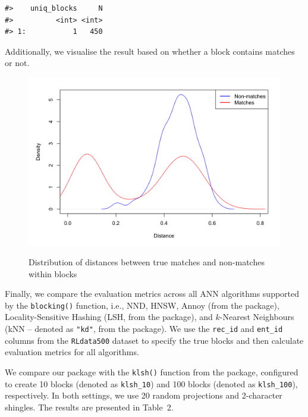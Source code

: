 \begin{verbatim}
#>    uniq_blocks     N
#>          <int> <int>
#> 1:           1   450
\end{verbatim}

Additionally, we visualise the result based on whether a block contains
matches or not.

\begin{figure}
\includegraphics[width=0.8\linewidth,alt={A density plot of distances between units that are true matches (red) and non-matches (blue) within blocks created by the \CRANpkg{blocking}. The distribution of distance for matches is bimodal. There is a group of units that are true matches where the distance between them is small (less than 0.2), whilst for the second group, the distance is similar to true non-matches (between 0.4 and 0.6). This distance may be used as additional information for deduplication (and record linkage) studies.}]{./figures/fig-1-density} \caption{Distribution of distances between true matches and non-matches within blocks}\label{fig:penguins-alison}
\end{figure}

Finally, we compare the evaluation metrics across all ANN algorithms
supported by the \texttt{blocking()} function, i.e., NND, HNSW, Annoy (from the
 package), Locality-Sensitive Hashing (LSH, from the
 package), and \(k\)-Nearest Neighbours (kNN -- denoted as
\texttt{"kd"}, from the  package). We use the \texttt{rec\_id} and
\texttt{ent\_id} columns from the \texttt{RLdata500} dataset to specify the true blocks
and then calculate evaluation metrics for all algorithms.

We compare our package with the \texttt{klsh()} function from the
 package, configured to create 10 blocks (denoted as
\texttt{klsh\_10}) and 100 blocks (denoted as \texttt{klsh\_100}), respectively. In both
settings, we use 20 random projections and 2-character shingles. The
results are presented in Table~2.

